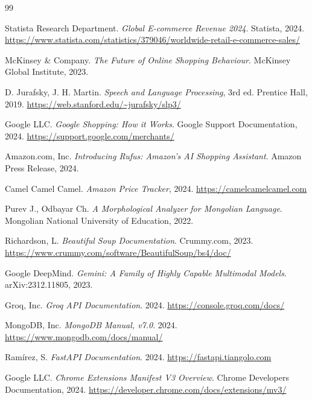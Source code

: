 \documentclass[12pt,a4paper]{report}
\begin{document}
\clearpage
\begin{thebibliography}{99}

Statista Research Department.
\textit{Global E-commerce Revenue 2024}.
Statista, 2024.
\url{https://www.statista.com/statistics/379046/worldwide-retail-e-commerce-sales/}

McKinsey \& Company.
\textit{The Future of Online Shopping Behaviour}.
McKinsey Global Institute, 2023.

D. Jurafsky, J. H. Martin.
\textit{Speech and Language Processing}, 3rd ed.
Prentice Hall, 2019.
\url{https://web.stanford.edu/~jurafsky/slp3/}

Google LLC.
\textit{Google Shopping: How it Works}.
Google Support Documentation, 2024.
\url{https://support.google.com/merchants/}

Amazon.com, Inc.
\textit{Introducing Rufus: Amazon's AI Shopping Assistant}.
Amazon Press Release, 2024.

Camel Camel Camel.
\textit{Amazon Price Tracker}, 2024.
\url{https://camelcamelcamel.com}

Purev J., Odbayar Ch.
\textit{A Morphological Analyzer for Mongolian Language}.
Mongolian National University of Education, 2022.

Richardson, L.
\textit{Beautiful Soup Documentation}.
Crummy.com, 2023.
\url{https://www.crummy.com/software/BeautifulSoup/bs4/doc/}

Google DeepMind.
\textit{Gemini: A Family of Highly Capable Multimodal Models}.
arXiv:2312.11805, 2023.

Groq, Inc.
\textit{Groq API Documentation}.
2024.
\url{https://console.groq.com/docs/}

MongoDB, Inc.
\textit{MongoDB Manual, v7.0}.
2024.
\url{https://www.mongodb.com/docs/manual/}

Ram\'irez, S.
\textit{FastAPI Documentation}.
2024.
\url{https://fastapi.tiangolo.com}

Google LLC.
\textit{Chrome Extensions Manifest V3 Overview}.
Chrome Developers Documentation, 2024.
\url{https://developer.chrome.com/docs/extensions/mv3/}


\end{thebibliography}
\end{document}
